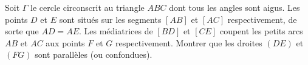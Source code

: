 Soit $\Gamma$ le cercle circonscrit au triangle $ABC$ dont tous les angles sont aigus. Les points $D$ et $E$
sont situés sur les segments $[AB]$ et $[AC]$ respectivement, de sorte que $AD = AE$. Les médiatrices de $[BD]$
et $[CE]$ coupent les petits arcs $AB$ et $AC$ aux points $F$ et $G$ respectivement. Montrer que les droites
$(DE)$ et $(FG)$ sont parallèles (ou confondues).
